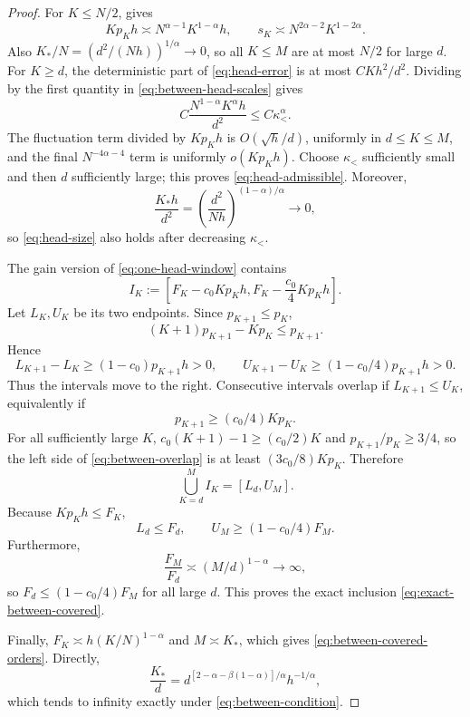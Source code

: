 \documentclass[11pt]{article}
\theoremstyle{definition}
\begin{document}
\begin{proof}
For $K\leq N/2$,  gives
\begin{equation}
 Kp_Kh\asymp N^{\alpha-1}K^{1-\alpha}h,
 \qquad
 s_K\asymp N^{2\alpha-2}K^{1-2\alpha}.
 \label{eq:between-head-scales}
\end{equation}
Also $K_*/N=(d^2/(Nh))^{1/\alpha}\to0$, so all $K\leq M$ are at most
$N/2$ for large $d$.  For $K\geq d$, the deterministic part of
\eqref{eq:head-error} is at most $CKh^2/d^2$.  Dividing by the first
quantity in \eqref{eq:between-head-scales} gives
\[
 C\frac{N^{1-\alpha}K^\alpha h}{d^2}
 \leq C\kappa_<^\alpha.
\]
The fluctuation term divided by $Kp_Kh$ is $O(\sqrt h/d)$, uniformly in
$d\leq K\leq M$, and the final $N^{-4\alpha-4}$ term is uniformly
$o(Kp_Kh)$.  Choose $\kappa_<$ sufficiently small and then $d$
sufficiently large; this proves \eqref{eq:head-admissible}.  Moreover,
\[
 \frac{K_*h}{d^2}
 =\left(\frac{d^2}{Nh}\right)^{(1-\alpha)/\alpha}\to0,
\]
so \eqref{eq:head-size} also holds after decreasing $\kappa_<$.

The gain version of \eqref{eq:one-head-window} contains
\begin{equation}
 I_K:=
 \left[F_K-c_0Kp_Kh,
       F_K-\frac{c_0}{4}Kp_Kh\right].
 \label{eq:between-IK}
\end{equation}
Let $L_K,U_K$ be its two endpoints.  Since $p_{K+1}\leq p_K$,
\[
 (K+1)p_{K+1}-Kp_K\leq p_{K+1}.
\]
Hence
\[
 L_{K+1}-L_K\geq(1-c_0)p_{K+1}h>0,
 \qquad
 U_{K+1}-U_K\geq(1-c_0/4)p_{K+1}h>0.
\]
Thus the intervals move to the right.  Consecutive intervals overlap if
$L_{K+1}\leq U_K$, equivalently if
\begin{equation}
 [c_0(K+1)-1]p_{K+1}
 \geq(c_0/4)Kp_K.
 \label{eq:between-overlap}
\end{equation}
For all sufficiently large $K$,
$c_0(K+1)-1\geq(c_0/2)K$ and
$p_{K+1}/p_K\geq3/4$, so the left side of
\eqref{eq:between-overlap} is at least
$(3c_0/8)Kp_K$.  Therefore
\[
 \bigcup_{K=d}^M I_K=[L_d,U_M].
\]
Because $Kp_Kh\leq F_K$,
\[
 L_d\leq F_d,
 \qquad
 U_M\geq(1-c_0/4)F_M.
\]
Furthermore,
\[
 \frac{F_M}{F_d}\asymp(M/d)^{1-\alpha}\to\infty,
\]
so $F_d\leq(1-c_0/4)F_M$ for all large $d$.  This proves the exact
inclusion \eqref{eq:exact-between-covered}.

Finally,
$F_K\asymp h(K/N)^{1-\alpha}$ and
$M\asymp K_*$, which gives \eqref{eq:between-covered-orders}.  Directly,
\[
 \frac{K_*}{d}
 =d^{[2-\alpha-\beta(1-\alpha)]/\alpha}h^{-1/\alpha},
\]
which tends to infinity exactly under \eqref{eq:between-condition}.
\end{proof}
\end{document}
